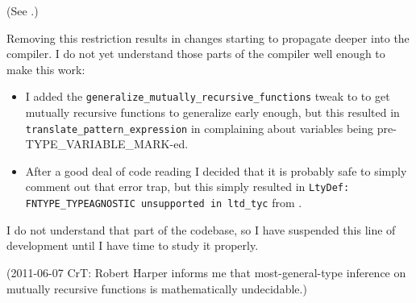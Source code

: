 (See .)

Removing this restriction results in changes starting to 
propagate deeper into the compiler.  I do not yet 
understand those parts of the compiler well enough to 
make this work:

\begin{itemize}
\item I added the {\tt generalize\_mutually\_recursive\_functions} tweak to 
      to get mutually recursive functions to generalize early enough, but this resulted in 
      {\tt translate\_pattern\_expression} in 
      complaining about variables being pre-{\sc TYPE\_VARIABLE\_MARK}-ed. 
\item After a good deal of code reading I decided that it is probably safe to 
      simply comment out that error trap, but this simply resulted in  
      {\tt LtyDef: {\sc FNTYPE\_TYPEAGNOSTIC} unsupported in ltd\_tyc} from 
      .
\end{itemize}

I do not understand that part of the codebase, so I have suspended this 
line of development until I have time to study it properly.

(2011-06-07 CrT: Robert Harper informs me that most-general-type inference 
                 on mutually recursive functions is mathematically undecidable.)